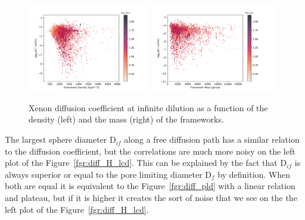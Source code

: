 \documentclass[main]{subfiles}
\begin{document}
\begin{figure}[ht]
  \centering
    \includegraphics[width=0.48\textwidth]{figures/5-diffusion/D_log-density_s_+.pdf}
    \includegraphics[width=0.48\textwidth]{figures/5-diffusion/D_log-mass_s_+.pdf}
    \caption{Xenon diffusion coefficient at infinite dilution as a function of the density (left) and the mass (right) of the frameworks. }\label{fgr:diff_density_mass}
\end{figure}

The largest sphere diameter D$_{if}$ along a free diffusion path has a similar relation to the diffusion coefficient, but the correlations are much more noisy on the left plot of the Figure~\ref{fgr:diff_H_lcd}.  This can be explained by the fact that D$_{if}$ is always superior or equal to the pore limiting diameter  D$_{f}$ by definition. When both are equal it is equivalent to the Figure~\ref{fgr:diff_pld} with a linear relation and plateau, but if it is higher it creates the sort of noise that we see on the the left plot of the Figure~\ref{fgr:diff_H_lcd}. 
\end{document}
